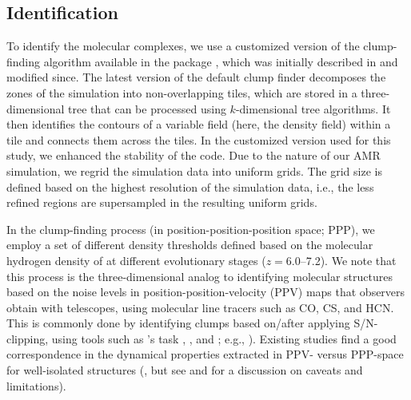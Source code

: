 \IfFileExists{emulateapjlegacy.cls}{\documentclass[iop]{emulateapjlegacy}}{\documentclass[iop]{emulateapj}}
\begin{document}
\subsection{Identification}\label{sec:method}

To identify the molecular complexes, we use a customized version of the clump-finding algorithm available in the  package  \citep{Turk11a}, which was initially described in \citet{Smith09a} and modified since.
%
The latest version of the default  clump finder decomposes the zones of the simulation into non-overlapping tiles, which are stored in a three-dimensional tree that can be processed using $k$-dimensional tree algorithms. It then identifies the contours of a variable field (here, the density field) within a tile and connects them across the tiles. In the customized version used for this study, we enhanced the stability of the code.
%
Due to the nature of our AMR simulation, we regrid the simulation data into uniform grids. The grid size is defined based on the highest resolution of the simulation data, i.e., the less refined regions are supersampled in the resulting uniform grids.

In the clump-finding process (in position-position-position space; PPP), we employ a set of different density thresholds defined based on the molecular hydrogen density of \flower at different evolutionary stages ($z=6.0$--7.2).
%
We note that this process is the three-dimensional analog to identifying molecular structures based on the noise levels in position-position-velocity (PPV) maps that observers obtain with telescopes, using molecular line tracers such as CO, CS, and HCN. This is commonly done by
identifying clumps based on/after applying S/N-clipping, using tools such as 's task , , and ; e.g., \citealt{Williams94a, Oka01a, Rosolowsky06a, Rosolowsky08a, DonovanMeyer13a}).
%
Existing studies find a good correspondence in the dynamical properties extracted in PPV- versus PPP-space for well-isolated structures (\citealt{Ballesteros-Paredes02a, Heitsch09a, Shetty10a, Beaumont13a, Pan15a}, but see \citealt{Ballesteros-Paredes02a} and \citealt{Shetty10a} for a discussion on caveats and limitations).
\end{document}
